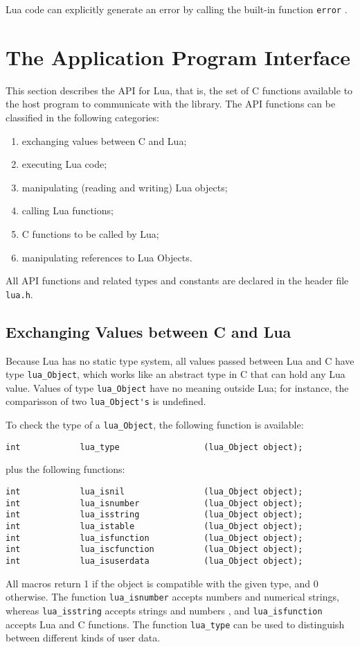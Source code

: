 Lua code can explicitly generate an error by calling the built-in
function \verb'error' .


\section{The Application Program Interface}

This section describes the API for Lua, that is,
the set of C functions available to the host program to communicate
with the library.
The API functions can be classified in the following categories:
\begin{enumerate}
\item exchanging values between C and Lua;
\item executing Lua code;
\item manipulating (reading and writing) Lua objects;
\item calling Lua functions;
\item C functions to be called by Lua;
\item manipulating references to Lua Objects.
\end{enumerate}
All API functions and related types and constants
are declared in the header file \verb'lua.h'.

\subsection{Exchanging Values between C and Lua} \label{valuesCLua}
Because Lua has no static type system,
all values passed between Lua and C have type
\verb'lua_Object',
which works like an abstract type in C that can hold any Lua value.
Values of type \verb'lua_Object' have no meaning outside Lua;
for instance,
the comparisson of two \verb"lua_Object's" is undefined.

To check the type of a \verb'lua_Object',
the following function is available:
\begin{verbatim}
int            lua_type                 (lua_Object object);
\end{verbatim}
plus the following functions:
\begin{verbatim}
int            lua_isnil                (lua_Object object);
int            lua_isnumber             (lua_Object object);
int            lua_isstring             (lua_Object object);
int            lua_istable              (lua_Object object);
int            lua_isfunction           (lua_Object object);
int            lua_iscfunction          (lua_Object object);
int            lua_isuserdata           (lua_Object object);
\end{verbatim}
All macros return 1 if the object is compatible with the given type,
and 0 otherwise.
The function \verb'lua_isnumber' accepts numbers and numerical strings,
whereas
\verb'lua_isstring' accepts strings and numbers ,
and \verb'lua_isfunction' accepts Lua and C functions.
The function \verb'lua_type' can be used to distinguish between
different kinds of user data.


